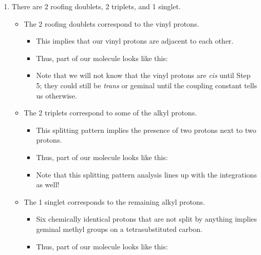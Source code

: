 \documentclass[../notes.tex]{subfiles}
\begin{document}
\begin{itemize}
\begin{enumerate}
\begin{itemize}
        \end{itemize}
        \item There are 2 roofing doublets, 2 triplets, and 1 singlet.
        \begin{itemize}
            \item The 2 roofing doublets correspond to the vinyl protons.
            \begin{itemize}
                \item This implies that our vinyl protons are adjacent to each other.
                \item Thus, part of our molecule looks like this: {\tiny{}}
                \item Note that we will not know that the vinyl protons are \emph{cis} until Step 5; they could still be \emph{trans} or geminal until the coupling constant tells us otherwise.
            \end{itemize}
            \item The 2 triplets correspond to some of the alkyl protons.
            \begin{itemize}
                \item This splitting pattern implies the presence of two protons next to two protons.
                \item Thus, part of our molecule looks like this: {\tiny{}}
                \item Note that this splitting pattern analysis lines up with the integrations as well!
            \end{itemize}
            \item The 1 singlet corresponds to the remaining alkyl protons.
            \begin{itemize}
                \item Six chemically identical protons that are not split by anything implies geminal methyl groups on a tetrasubstituted carbon.
                \item Thus, part of our molecule looks like this: {\tiny{}}
            \end{itemize}
        \end{itemize}

\end{enumerate}
\end{itemize}
\end{document}
